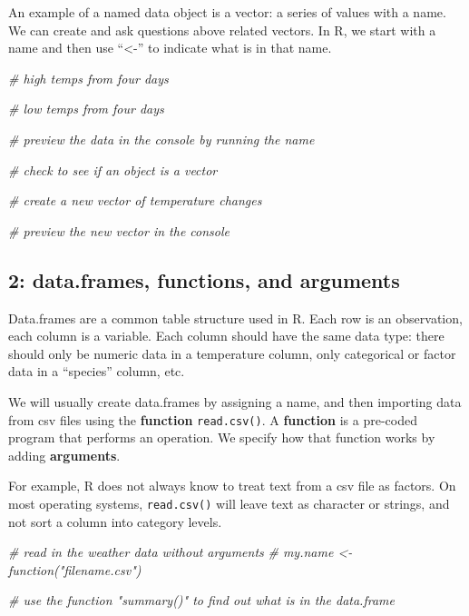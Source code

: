 \documentclass[
]{article}
\newenvironment{Shaded}{\begin{snugshade}}{\end{snugshade}}
\newcommand{\CommentTok}[1]{\textcolor[rgb]{0.56,0.35,0.01}{\textit{#1}}}
\begin{document}
An example of a named data object is a vector: a series of values with a
name. We can create and ask questions above related vectors. In R, we
start with a name and then use ``\textless-'' to indicate what is in
that name.

\begin{Shaded}
\begin{Highlighting}[]
\CommentTok{\# high temps from four days}

\CommentTok{\# low temps from four days}

\CommentTok{\# preview the data in the console by running the name}

\CommentTok{\# check to see if an object is a vector}

\CommentTok{\# create a new vector of temperature changes}

\CommentTok{\# preview the new vector in the console}
\end{Highlighting}
\end{Shaded}

\subsection{2: data.frames, functions, and
arguments}\label{data.frames-functions-and-arguments}

Data.frames are a common table structure used in R. Each row is an
observation, each column is a variable. Each column should have the same
data type: there should only be numeric data in a temperature column,
only categorical or factor data in a ``species'' column, etc.

We will usually create data.frames by assigning a name, and then
importing data from csv files using the \textbf{function}
\texttt{read.csv()}. A \textbf{function} is a pre-coded program that
performs an operation. We specify how that function works by adding
\textbf{arguments}.

For example, R does not always know to treat text from a csv file as
factors. On most operating systems, \texttt{read.csv()} will leave text
as character or strings, and not sort a column into category levels.

\begin{Shaded}
\begin{Highlighting}[]
\CommentTok{\# read in the weather data without arguments}
\CommentTok{\# my.name \textless{}{-} function("filename.csv")}

\CommentTok{\# use the function "summary()" to find out what is in the data.frame}
\end{Highlighting}
\end{Shaded}
\end{document}
